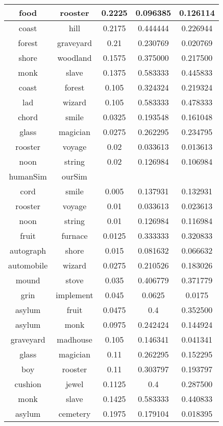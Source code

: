 \begin{table}[p]
\begin{center}
{\begin{tabular}{|c|c|c|c|c|}
\hline
food & rooster & 0.2225 & 0.096385 & 0.126114 \\
\hline
coast & hill & 0.2175 & 0.444444 & 0.226944 \\
\hline
forest & graveyard & 0.21 & 0.230769 & 0.020769 \\
\hline
shore & woodland & 0.1575 & 0.375000 & 0.217500 \\
\hline
monk & slave & 0.1375 & 0.583333 & 0.445833 \\
\hline
coast & forest & 0.105 & 0.324324 & 0.219324 \\
\hline
lad & wizard & 0.105 & 0.583333 & 0.478333 \\
\hline
chord & smile & 0.0325 & 0.193548 & 0.161048 \\
\hline
glass & magician & 0.0275 & 0.262295 & 0.234795 \\
\hline
rooster & voyage & 0.02 & 0.033613 & 0.013613 \\
\hline
noon & string & 0.02 & 0.126984 & 0.106984 \\
\hline
humanSim & ourSim &  &  &  \\
\hline
cord & smile & 0.005 & 0.137931 & 0.132931 \\
\hline
rooster & voyage & 0.01 & 0.033613 & 0.023613 \\
\hline
noon & string & 0.01 & 0.126984 & 0.116984 \\
\hline
fruit & furnace & 0.0125 & 0.333333 & 0.320833 \\
\hline
autograph & shore & 0.015 & 0.081632 & 0.066632 \\
\hline
automobile & wizard & 0.0275 & 0.210526 & 0.183026 \\
\hline
mound & stove & 0.035 & 0.406779 & 0.371779 \\
\hline
grin & implement & 0.045 & 0.0625 & 0.0175 \\
\hline
asylum & fruit & 0.0475 & 0.4 & 0.352500 \\
\hline
asylum & monk & 0.0975 & 0.242424 & 0.144924 \\
\hline
graveyard & madhouse & 0.105 & 0.146341 & 0.041341 \\
\hline
glass & magician & 0.11 & 0.262295 & 0.152295 \\
\hline
boy & rooster & 0.11 & 0.303797 & 0.193797 \\
\hline
cushion & jewel & 0.1125 & 0.4 & 0.287500 \\
\hline
monk & slave & 0.1425 & 0.583333 & 0.440833 \\
\hline
asylum & cemetery & 0.1975 & 0.179104 & 0.018395 \\

\end{tabular}}
\end{center}
\end{table}
